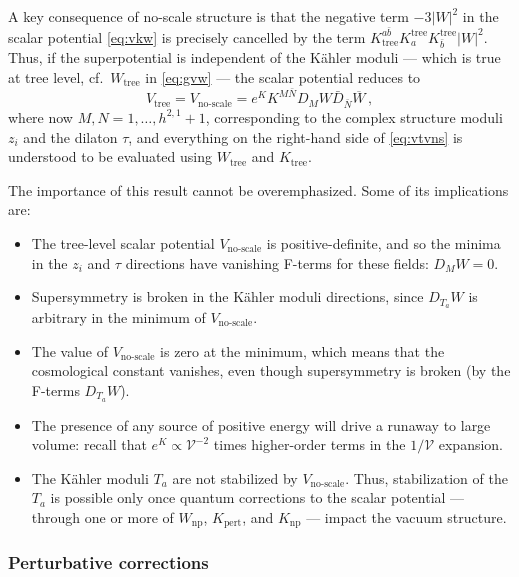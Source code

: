 \documentclass[12pt,a4wide]{article}
\def\V{\mathcal{V}}
\begin{document}
A key consequence of no-scale structure is that
the negative term $-3|W|^2$ in the scalar potential \eqref{eq:vkw} is precisely cancelled by the
term $K^{a\bar b}_{\text{tree}}K_a^{\text{tree}} K_{\bar b}^{\text{tree}} |W|^2$. 
Thus, if the superpotential is independent of the
K\"ahler moduli --- which is true at tree level, cf.~$W_{\text{tree}}$ in \eqref{eq:gvw} ---  the scalar potential reduces to  
\begin{equation}\label{eq:vtvns}
    V_{\text{tree}}=V_{\text{no-scale}}=e^K K^{M\bar N}D_M W {\bar{D}}_{\bar N}\overline{W}\,,
\end{equation}
where now $M,N=1,\ldots, h^{2,1}+1$, corresponding to the complex structure moduli $z_i$ and the dilaton $\tau$, and everything on the right-hand side of \eqref{eq:vtvns} is understood to be evaluated using $W_{\text{tree}}$ and $K_{\text{tree}}$.

The importance of this result cannot be overemphasized. Some of its implications are:
\begin{itemize}
    \item The tree-level scalar potential $V_{\text{no-scale}}$ is positive-definite,   
    and so the minima in the $z_i$ and $\tau$ directions have vanishing F-terms for these fields: $D_MW=0$.
    \item Supersymmetry is broken in the K\"ahler moduli directions, since $D_{T_a}W$ is arbitrary in the minimum of $V_{\text{no-scale}}$.
    \item The value of $V_{\text{no-scale}}$ is zero at the minimum, which means that the cosmological constant vanishes,  even though supersymmetry is broken (by the F-terms $D_{T_a}W$).
     \item The presence of any source of positive energy will drive a runaway to large volume: recall that $e^K \propto \V^{-2}$ times higher-order terms in the $1/\V$ expansion.
    \item The K\"ahler moduli $T_a$ are not stabilized by $V_{\text{no-scale}}$.  Thus, stabilization of the $T_a$ is possible only once
    quantum corrections to the scalar potential --- through one or more of $W_{\text{np}}$, $K_{\text{pert}}$, and $K_{\text{np}}$ --- impact the vacuum structure.
\end{itemize}

\subsubsection{Perturbative corrections}\label{sss:kpert}
\end{document}
